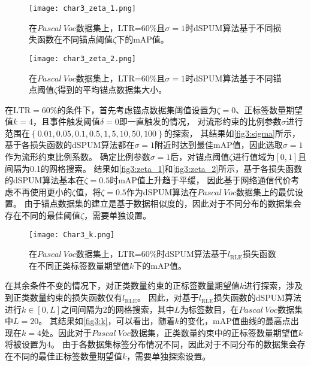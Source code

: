 \begin{figure}[htbp]
    \centering
    \texttt{[image: char3\_zeta\_1.png]}
    \caption{\label{fig3:zeta_1}在$Pascal~Voc$数据集上，LTR=60\%且$\sigma=1$时dSPUM算法基于不同损失函数在不同锚点阈值$\zeta$下的mAP值。}
\end{figure}
\begin{figure}[htbp]
    \centering
    \texttt{[image: char3\_zeta\_2.png]}
    \caption{\label{fig3:zeta_2}{在$Pascal~Voc$数据集上，LTR=60\%且$\sigma=1$时dSPUM算法基于不同锚点阈值$\zeta$得到的平均锚点数据集大小。}}
\end{figure}
在$\mathrm{LTR=60\%}$的条件下，首先考虑锚点数据集阈值设置为$\zeta=0$、正标签数量期望值$k=4$，且事件触发阈值$\delta=0$即一直触发的情况，
对流形约束的比例参数$\sigma$进行范围在$\left\{0.01, 0.05, 0.1, 0.5, 1, 5, 10, 50, 100\right\}$的探索，
其结果如\autoref{fig3:sigma}所示，基于各损失函数的dSPUM算法都在$\sigma=1$附近时达到最佳mAP值，因此选取$\sigma=1$作为流形约束比例系数。
确定比例参数$\sigma=1$后，对锚点阈值$\zeta$进行值域为$\left[0,1\right]$且间隔为0.1的网格搜索。
结果如\autoref{fig3:zeta_1}和\autoref{fig3:zeta_2}所示，基于各损失函数的dSPUM算法基本在$\zeta=0.5$时mAP值上升趋于平缓，
因此基于网络通信代价考虑不再使用更小的$\zeta$值，将$\zeta=0.5$作为dSPUM算法在$Pascal~Voc$数据集上的最优设置。
由于锚点数据集的建立是基于数据相似度的，因此对于不同分布的数据集会存在不同的最佳阈值$\zeta$，需要单独设置。

\begin{figure}[htbp]
    \centering
    \texttt{[image: Char3\_k.png]}
    \caption{\label{fig3:k}{在$Pascal~Voc$数据集上，LTR=60\%时dSPUM算法基于$l_{\mathrm{RLE}}$损失函数在不同正类标签数量期望值$k$下的mAP值。}}
\end{figure}

在其余条件不变的情况下，对正类数量约束的正标签数量期望值$k$进行探索，涉及到正类数量约束的损失函数仅有$l_{\mathrm{RLE}}$。
因此，对基于$l_{\mathrm{RLE}}$损失函数的dSPUM算法进行$k\in\left[0,L\right]$之间间隔为2的网格搜索，其中$L$为标签数目，在$Pascal~Voc$数据集中$L=20$。
其结果如\autoref{fig3:k}，可以看出，随着$k$的变化，mAP值曲线的最高点出现在$k=4$处。因此对于$Pascal~Voc$数据集，正类数量约束中的正标签数量期望值$k$将被设置为4。
由于各数据集标签分布情况不同，因此对于不同分布的数据集会存在不同的最佳正标签数量期望值$k$，需要单独探索设置。

